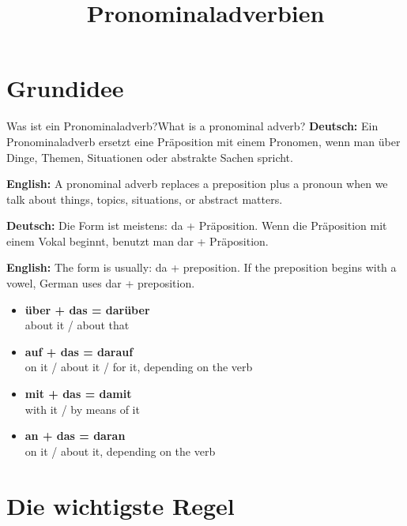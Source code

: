 \documentclass[a4paper,11pt]{article}
\title{Pronominaladverbien}
\date{}
\newcommand{\GermanText}[1]{\textbf{Deutsch: }#1\par}
\newcommand{\EnglishText}[1]{{\small\color{SoftGray}\textbf{English: }#1\par}}
\newcommand{\ExampleItem}[2]{\item \textbf{#1}\\{\small\color{SoftGray}#2}}
\begin{document}
    \maketitle
    \tableofcontents
    \newpage
    
    
    \section{Grundidee}
        
        \begin{grammarentry}{Was ist ein Pronominaladverb?}{What is a pronominal adverb?}
            \GermanText{Ein Pronominaladverb ersetzt eine Präposition mit einem Pronomen, wenn man über Dinge, Themen, Situationen oder abstrakte Sachen spricht.}
            \EnglishText{A pronominal adverb replaces a preposition plus a pronoun when we talk about things, topics, situations, or abstract matters.}
            
            \GermanText{Die Form ist meistens: da + Präposition. Wenn die Präposition mit einem Vokal beginnt, benutzt man dar + Präposition.}
            \EnglishText{The form is usually: da + preposition. If the preposition begins with a vowel, German uses dar + preposition.}
            
            \begin{exbox}
                \begin{itemize}
                    \ExampleItem{über + das = darüber}{about it / about that}
                    \ExampleItem{auf + das = darauf}{on it / about it / for it, depending on the verb}
                    \ExampleItem{mit + das = damit}{with it / by means of it}
                    \ExampleItem{an + das = daran}{on it / about it, depending on the verb}
                \end{itemize}
            \end{exbox}
        \end{grammarentry}
    
    
    \section{Die wichtigste Regel}
        
\end{document}

